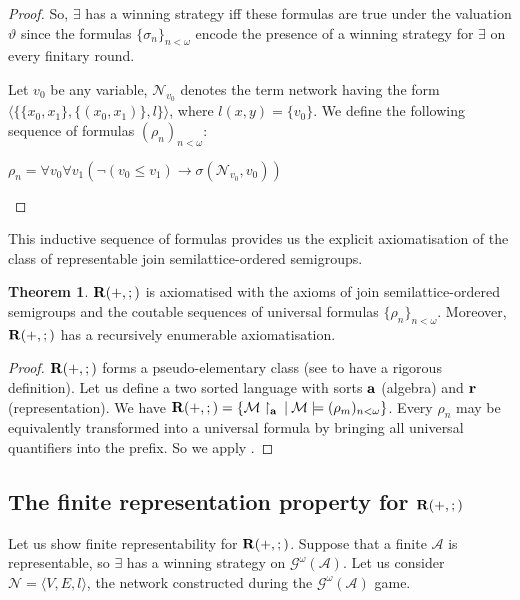 \documentclass[a4paper]{article}
\theoremstyle{definition}
\theoremstyle{theorem}
\newtheorem{theorem}{Theorem}
\theoremstyle{proposition}
\theoremstyle{lemma}
\theoremstyle{ex}
\theoremstyle{corollary}
\theoremstyle{claim}
\begin{document}
\begin{proof}
  So, $\exists$ has a winning strategy iff these formulas are true under the valuation $\vartheta$ since the formulas $\{ \sigma_n \}_{n < \omega}$ encode the presence of a winning strategy for $\exists$ on every finitary round.

  Let $v_0$ be any variable, $\mathcal{N}_{v_0}$ denotes the term network having the form
  $\langle \{ \{ x_0, x_1 \}, \{ (x_0, x_1) \}, l \} \rangle$, where $l(x,y) = \{ v_0 \}$.
  We define the following sequence of formulas $(\rho_n)_{n < \omega}$:
  \begin{center}
    $\rho_n = \forall v_0 \forall v_1 (\neg (v_0 \leq v_1) \to \sigma(\mathcal{N}_{v_0}, v_0))$
  \end{center}
\end{proof}

This inductive sequence of formulas provides us the explicit axiomatisation of the class of representable join semilattice-ordered semigroups.

\begin{theorem}\label{axiomatisation}
  ${\bf R}(+, ;)$ is axiomatised with the axioms of join semilattice-ordered semigroups and the coutable sequences of universal formulas $\{ \rho_n \}_{n < \omega}$. Moreover, ${\bf R}(+, ;)$ has a recursively enumerable axiomatisation.
\end{theorem}

\begin{proof}
  ${\bf R}(+, ;)$ forms a pseudo-elementary class (see \cite{eklof1977ultraproducts} to have a rigorous definition). Let us define a two sorted language with sorts ${\bf a}$ (algebra) and ${\bf r}$ (representation). We have ${\bf R}(+, ;) = \{ \mathcal{M} \upharpoonright_{\bf a} \: | \: \mathcal{M} \models (\rho_m)_{n < \omega} \}$.
  Every $\rho_n$ may be equivalently transformed into a universal formula by bringing all universal quantifiers into the prefix.
  So we apply \cite[Theorem 9.28]{hirsch2002relation}.
\end{proof}

\subsection{The finite representation property for ${\bf R}(+, ;)$}

Let us show finite representability for ${\bf R}(+, ;)$. Suppose that a finite $\mathcal{A}$ is representable, so $\exists$ has a winning strategy on $\mathcal{G}^{\omega}(\mathcal{A})$. Let us consider $\mathcal{N} = \langle V, E, l \rangle$, the network constructed during the $\mathcal{G}^{\omega}(\mathcal{A})$ game.
\end{document}
